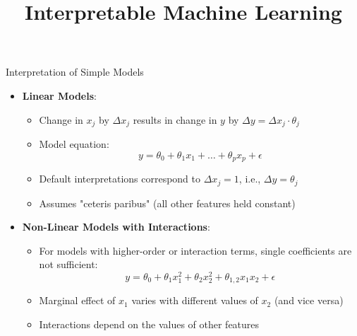 \documentclass[10pt,compress,t,notes=noshow, xcolor=table]{beamer}
\title{Interpretable Machine Learning}
\date{}
\begin{document}



\begin{frame}{Interpretation of Simple Models}
\begin{itemize}
\item \textbf{Linear Models}:
\begin{itemize}
\item Change in $x_j$ by $\Delta x_j$ results in change in $y$ by $\Delta y = \Delta x_j \cdot \theta_j$
\item Model equation:
\[
y = \theta_0 + \theta_1 x_1 + \dots + \theta_p x_p + \epsilon
\]
\item Default interpretations correspond to $\Delta x_j = 1$, i.e., $\Delta y = \theta_j$
\item Assumes "ceteris paribus" (all other features held constant)
\end{itemize}
\pause
\item \textbf{Non-Linear Models with Interactions}:
\begin{itemize}
\item For models with higher-order or interaction terms, single coefficients are not sufficient:
\[
y = \theta_0 + \theta_{1} x_1^2 + \theta_{2} x_2^2 + \theta_{1,2} x_1 x_2 + \epsilon
\]
\item Marginal effect of $x_1$ varies with different values of $x_2$ (and vice versa)
\item Interactions depend on the values of other features
\end{itemize}
\end{itemize}
\end{frame}

\end{document}
